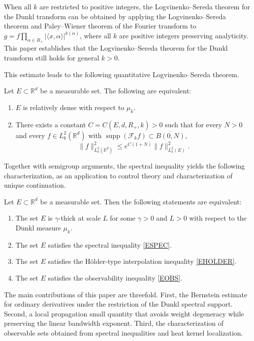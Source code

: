 \documentclass[12pt]{article}
\DeclareMathOperator{\supp}{supp}
\begin{document}
When all $k$ are restricted to positive integers, the Logvinenko--Sereda theorem for the Dunkl transform can be obtained by applying the Logvinenko--Sereda theorem and Paley--Wiener theorem of the Fourier transform to  $g = f \prod_{\alpha\in R_+}|\langle x,\alpha \rangle|^{k(\alpha)}$, where all $k$ are positive integers preserving analyticity. This paper establishes that the Logvinenko--Sereda theorem for the Dunkl transform still holds for general $k>0$.

This estimate leads to the following quantitative Logvinenko--Sereda theorem.
\begin{theorem}
\label{thm:main}
Let $E \subset \mathbb{R}^d$ be a measurable set. The following are equivalent:
\begin{enumerate}
\item[(i)] $E$ is relatively dense with respect to $\mu_k$.
\item[(ii)] There exists a constant $C = C(E,d,R_+,k)>0$ such that for every $N>0$ and every $f \in L_k^2(\mathbb{R}^d)$ with $\supp(\mathcal{F}_k f) \subset \overline{B(0,N)}$,
\[
\| f \|_{L_k^2(\mathbb{R}^d)}^2 \leq e^{C(1+N)} \| f \|_{L_k^2(E)}^2.
\]
\end{enumerate}
\end{theorem}
Together with semigroup arguments, the spectral inequality yields the following characterization, as an application to control theory and characterization of unique continuation.

\begin{theorem}\label{TOHS}
Let $E \subset \mathbb{R}^d$ be a measurable set. Then the following statements are equivalent:
\begin{enumerate}
\item[(i)] The set $E$ is $\gamma$-thick at scale $L$ for some $\gamma > 0$ and $L > 0$ with respect to the Dunkl measure $\mu_k$.
\item[(ii)] The set $E$ satisfies the spectral inequality \eqref{ESPEC}.
\item[(iii)] The set $E$ satisfies the H\"older-type interpolation inequality \eqref{EHOLDER}.
\item[(iv)] The set $E$ satisfies the observability inequality \eqref{EOBS}.
\end{enumerate}
\end{theorem}

The main contributions of this paper are threefold. First, the Bernstein estimate for ordinary derivatives under the restriction of the Dunkl spectral support. Second, a local propagation small quantity that avoids weight degeneracy while preserving the linear bandwidth exponent. Third, the characterization of observable sets obtained from spectral inequalities and heat kernel localization.
\end{document}
